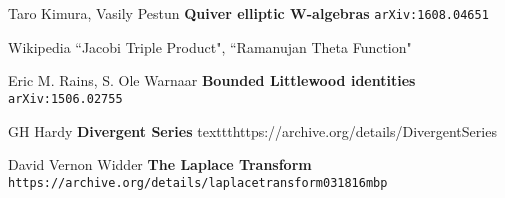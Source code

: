 \documentclass[12pt]{article}
\begin{document}
\selectfont \fontsize{12}{10}\selectfont

\begin{thebibliography}{}

\item Taro Kimura, Vasily Pestun \textbf{Quiver elliptic W-algebras} \texttt{arXiv:1608.04651}
\item Wikipedia ``Jacobi Triple Product", ``Ramanujan Theta Function"
\item Eric M. Rains, S. Ole Warnaar \textbf{Bounded Littlewood identities} \texttt{arXiv:1506.02755}
\item GH Hardy \textbf{Divergent Series} texttt{https://archive.org/details/DivergentSeries}
\item David Vernon Widder \textbf{The Laplace Transform} \texttt{https://archive.org/details/laplacetransform031816mbp}

\end{thebibliography}
\end{document}
